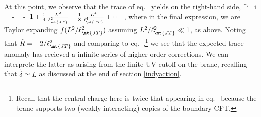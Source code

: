 At this point, we observe that  the trace of eq.~ yields on the right-hand side,
\beq\label{almost}
\langle {}^i{}_i \rangle = -\, =-\, \(1+\frac14\,\frac{L^2}{\ell_\mt{JT}^2}+\frac18\,\frac{L^4}{\ell_\mt{JT}^4}+\cdots\)\,,
\eeq
where in the final expression, we are Taylor expanding $f(L^2/\ell_\mt{JT}^2)$ assuming $L^2/\ell_\mt{JT}^2\ll 1$, as above. Noting that $\tilde R=-2/\ell^2_\mt{JT}$ and comparing to eq.~,\footnote{Recall that the central charge here is twice that appearing in eq.~ because the brane supports two (weakly interacting) copies of the boundary CFT.} we see that the expected trace anomaly has recieved a infinite series of higher order corrections. We can interprete the latter as arising from the finite UV cutoff on the brane, recalling that $\tilde\delta\simeq L$ as discussed at the end of section \ref{indyaction}. 

